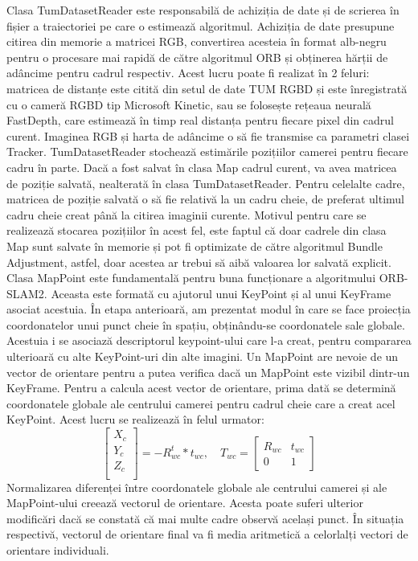 \documentclass[12pt,a4paper]{report}
\begin{document}
Clasa TumDatasetReader este responsabilă de achiziția de date și de scrierea 
în fișier a traiectoriei pe care o estimează algoritmul. Achiziția de date 
presupune citirea din memorie a matricei RGB, convertirea acesteia în format alb-negru pentru 
o procesare mai rapidă de către algoritmul ORB și obținerea hărții de adâncime pentru 
cadrul respectiv. Acest lucru poate fi realizat în 2 feluri: matricea de distanțe este citită
din setul de date TUM RGBD și este înregistrată cu o cameră RGBD tip Microsoft Kinetic,
sau se folosește rețeaua neurală FastDepth, care estimează în timp real distanța pentru
fiecare pixel din cadrul curent. Imaginea RGB și harta de adâncime
o să fie transmise ca parametri clasei Tracker. TumDatasetReader stochează estimările 
pozițiilor camerei pentru fiecare cadru în parte. Dacă a fost salvat în clasa Map cadrul curent,
va avea matricea de poziție salvată, nealterată în clasa TumDatasetReader. Pentru celelalte cadre,
matricea de poziție salvată o să fie relativă la un cadru cheie, de preferat ultimul cadru cheie creat până
la citirea imaginii curente. Motivul pentru care se realizează stocarea pozițiilor în acest 
fel, este faptul că doar cadrele din clasa Map sunt salvate în memorie și pot fi optimizate 
de către algoritmul Bundle Adjustment, astfel, doar acestea ar trebui să aibă valoarea lor 
salvată explicit. \\

Clasa MapPoint este fundamentală pentru buna funcționare a algoritmului ORB-SLAM2. Aceasta este 
formată cu ajutorul unui KeyPoint și al unui KeyFrame asociat acestuia. În etapa anterioară, 
am prezentat modul în care se face proiecția coordonatelor unui punct cheie în spațiu, obținându-se 
coordonatele sale globale. Acestuia i se asociază descriptorul keypoint-ului care l-a creat, pentru
compararea ulterioară cu alte KeyPoint-uri din alte imagini. Un MapPoint are nevoie de un vector de orientare
pentru a putea verifica dacă un MapPoint este vizibil dintr-un KeyFrame. Pentru a 
calcula acest vector de orientare, prima dată se determină coordonatele globale ale centrului camerei
pentru cadrul cheie care a creat acel KeyPoint. Acest lucru se realizează în felul urmator:
\begin{equation}
    \begin{bmatrix}
        X_{c} \\
        Y_{c} \\
        Z_{c} \\
        \end{bmatrix} = -R_{wc}^t * t_{wc}, \quad{}  
        T_{wc} =     
     \begin{bmatrix}
            R_{wc} & t_{wc} \\
            0 & 1
        \end{bmatrix}
\end{equation} 
Normalizarea diferenței între coordonatele globale ale centrului camerei și ale MapPoint-ului creează
vectorul de orientare. Acesta poate suferi ulterior modificări dacă se constată că mai multe cadre observă același
punct. În situația respectivă, vectorul de orientare final va fi media aritmetică a celorlalți vectori 
de orientare individuali.
\end{document}
